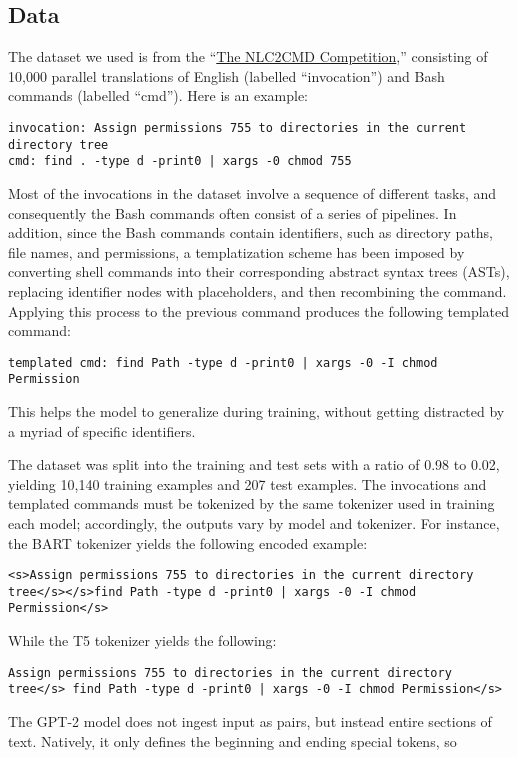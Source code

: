 \subsection{Data}
The dataset we used is from the
``\href{https://nlc2cmd.us-east.mybluemix.net/}{The NLC2CMD Competition},''
consisting of 10,000 parallel translations of English (labelled
``invocation'') and Bash commands (labelled ``cmd''). Here is an example:
\begin{verbatim}
invocation: Assign permissions 755 to directories in the current directory tree
cmd: find . -type d -print0 | xargs -0 chmod 755
\end{verbatim}
Most of the invocations in the dataset involve a sequence of different tasks,
and consequently the Bash commands often consist of a series of pipelines. In
addition, since the Bash commands contain identifiers, such as directory paths,
file names, and permissions, a templatization scheme has been imposed by
converting shell commands into their corresponding abstract syntax trees
(ASTs), replacing identifier nodes with placeholders, and then recombining the
command. Applying this process to the previous command produces the following
templated command:
\begin{verbatim}
templated cmd: find Path -type d -print0 | xargs -0 -I chmod Permission
\end{verbatim}
This helps the model to generalize during training, without getting distracted
by a myriad of specific identifiers.
\par
The dataset was split into the training and test sets with a ratio of 0.98 to 0.02, yielding 10,140 training examples and 207 test examples. The invocations and templated commands must be tokenized by the same tokenizer used in training each model; accordingly, the outputs vary by model and tokenizer. For instance, the BART tokenizer yields the following encoded example:
\begin{verbatim}
<s>Assign permissions 755 to directories in the current directory 
tree</s></s>find Path -type d -print0 | xargs -0 -I chmod Permission</s>
\end{verbatim}
While the T5 tokenizer yields the following:
\begin{verbatim}
Assign permissions 755 to directories in the current directory 
tree</s> find Path -type d -print0 | xargs -0 -I chmod Permission</s>
\end{verbatim}
The GPT-2 model does not ingest input as pairs, but instead entire sections of
text. Natively, it only defines the beginning and ending special tokens, so
